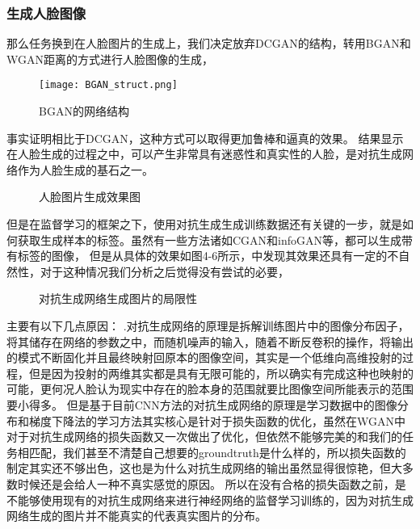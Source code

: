 \subsubsection{生成人脸图像}
那么任务换到在人脸图片的生成上，我们决定放弃DCGAN的结构，转用BGAN\cite{BGAN}和WGAN距离\cite{WGAN}的方式进行人脸图像的生成，
\begin{figure}[h]
  \centering
    \texttt{[image: BGAN\_struct.png]}
  \caption{BGAN的网络结构}
\end{figure}
事实证明相比于DCGAN，这种方式可以取得更加鲁棒和逼真的效果。
结果显示在人脸生成的过程之中，可以产生非常具有迷惑性和真实性的人脸，是对抗生成网络作为人脸生成的基石之一。
\begin{figure}[!ht]
 \centering 
	\caption{人脸图片生成效果图}
\end{figure}
但是在监督学习的框架之下，使用对抗生成生成训练数据还有关键的一步，就是如何获取生成样本的标签。虽然有一些方法诸如CGAN和infoGAN等，都可以生成带有标签的图像，
但是从具体的效果如图4-6所示，中发现其效果还具有一定的不自然性，对于这种情况我们分析之后觉得没有尝试的必要，
\begin{figure}[h]
\centering
{}
\caption{对抗生成网络生成图片的局限性}
\end{figure}

主要有以下几点原因：
.对抗生成网络的原理是拆解训练图片中的图像分布因子，将其储存在网络的参数之中，而随机噪声的输入，随着不断反卷积的操作，将输出的模式不断固化并且最终映射回原本的图像空间，其实是一个低维向高维投射的过程，但是因为投射的两维其实都是具有无限可能的，所以确实有完成这种也映射的可能，更何况人脸认为现实中存在的脸本身的范围就要比图像空间所能表示的范围要小得多。
但是基于目前CNN方法的对抗生成网络的原理是学习数据中的图像分布和梯度下降法的学习方法其实核心是针对于损失函数的优化，虽然在WGAN中对于对抗生成网络的损失函数又一次做出了优化，但依然不能够完美的和我们的任务相匹配，我们甚至不清楚自己想要的groundtruth是什么样的，所以损失函数的制定其实还不够出色，这也是为什么对抗生成网络的输出虽然显得很惊艳，但大多数时候还是会给人一种不真实感觉的原因。
所以在没有合格的损失函数之前，是不能够使用现有的对抗生成网络来进行神经网络的监督学习训练的，因为对抗生成网络生成的图片并不能真实的代表真实图片的分布。


